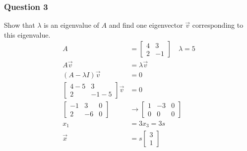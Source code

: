 \documentclass{math}
\begin{document}
\subsubsection*{Question 3}
Show that \( \lambda \) is an eigenvalue of \( A \) and find one eigenvector
\( \vec{v} \) corresponding to this eigenvalue.
\begin{align*}
  A &= \begin{bmatrix}
    4 & 3 \\
    2 & -1
  \end{bmatrix} \quad \lambda = 5 \\
  A\vec{v} &= \lambda\vec{v} \\
  (A-\lambda I)\vec{v} &= 0 \\
  \begin{bmatrix}
    4-5 & 3 \\
    2 & -1-5
  \end{bmatrix}\vec{v} &= 0 \\
  \begin{bmatrix}
    -1 & 3 & 0 \\
    2 & -6 & 0
  \end{bmatrix} &\to \begin{bmatrix}
    1 & -3 & 0 \\
    0 & 0 & 0
  \end{bmatrix} \\
  x_1 &= 3x_3 = 3s \\
  \vec{x} &= s\begin{bmatrix}3 \\ 1\end{bmatrix}
\end{align*}
\end{document}

